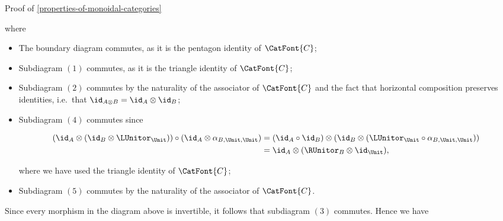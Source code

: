 \begin{Proof}{Proof of \cref{properties-of-monoidal-categories}}
\begin{scalemath}
    \end{scalemath}
    where
    \begin{itemize}
        \item The boundary diagram commutes, as it is the pentagon identity of $\CatFont{C}$;
        \item Subdiagram $(1)$ commutes, as it is the triangle identity of $\CatFont{C}$;
        \item Subdiagram $(2)$ commutes by the naturality of the associator of $\CatFont{C}$ and the fact that horizontal composition preserves identities, i.e.\ that $\id_{A\otimes B}=\id_{A}\otimes\id_{B}$;
        \item Subdiagram $(4)$ commutes since
            \begin{envsmallsize}
                \begin{align*}
                    (\id_{A}\otimes(\id_{B}\otimes\LUnitor_{\Unit}))\circ(\id_{A}\otimes\alpha_{B,\Unit,\Unit}) &= (\id_{A}\circ\id_{B})\otimes(\id_{B}\otimes(\LUnitor_{\Unit}\circ\alpha_{B,\Unit,\Unit}))\\
                                                                                                            &= \id_{A}\otimes(\RUnitor_{B}\otimes\id_{\Unit}),
                \end{align*}
            \end{envsmallsize}
            where we have used the triangle identity of $\CatFont{C}$;
        \item Subdiagram $(5)$ commutes by the naturality of the associator of $\CatFont{C}$.
    \end{itemize}
    Since every morphism in the diagram above is invertible, it follows that subdiagram $(3)$ commutes. Hence we have

\end{Proof}
